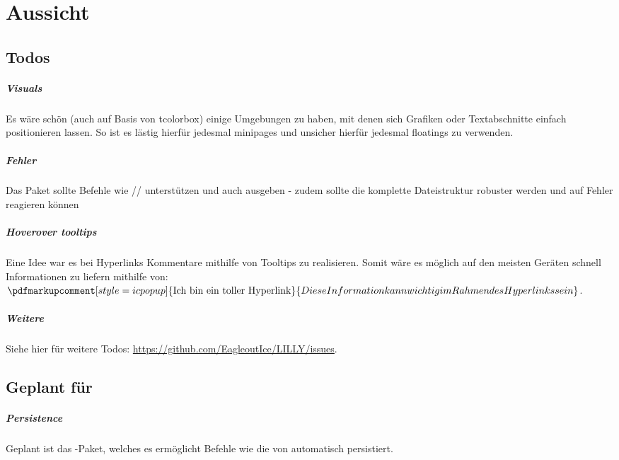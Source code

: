 \chapter{Aussicht}

\section{Todos}
\paragraph{Visuals}
Es wäre schön (auch auf Basis von tcolorbox) einige Umgebungen zu haben, mit denen sich Grafiken oder Textabschnitte einfach positionieren lassen. So ist es lästig hierfür jedesmal minipages und unsicher hierfür jedesmal floatings zu verwenden.
\paragraph{Fehler}
Das Paket sollte Befehle wie // unterstützen und auch ausgeben - zudem sollte die komplette Dateistruktur robuster werden und auf Fehler reagieren können

\paragraph{Hoverover tooltips}

Eine Idee war es bei Hyperlinks Kommentare mithilfe von Tooltips zu realisieren. Somit wäre es möglich auf den meisten Geräten schnell Informationen zu liefern mithilfe von: $\pdfmarkupcomment[style=icpopup]{\text{Ich bin ein toller Hyperlink}}{Diese Information kann wichtig im Rahmen des Hyperlinks sein}$.

\paragraph{Weitere}
Siehe hier für weitere Todos: \url{https://github.com/EagleoutIce/LILLY/issues}.

\section{Geplant für \small{}}

\paragraph{Persistence}
Geplant ist das -Paket, welches es ermöglicht Befehle wie die von  automatisch persistiert.

